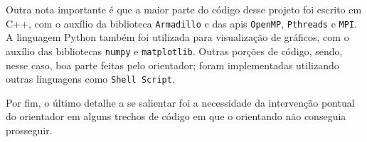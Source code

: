 Outra nota importante é que a maior parte do código desse projeto foi escrito em C++, com o auxílio da biblioteca \texttt{Armadillo} e das \gls{api}s \texttt{OpenMP}, \texttt{Pthreads} e \texttt{MPI}. A linguagem Python também foi utilizada para visualização de gráficos, com o auxílio das bibliotecas \texttt{numpy} e \texttt{matplotlib}. Outras porções de código, sendo, nesse caso, boa parte feitas pelo orientador; foram implementadas utilizando outras linguagens como \texttt{Shell Script}.

Por fim, o último detalhe a se salientar foi a necessidade da intervenção pontual do orientador em alguns trechos de código em que o orientando não conseguia prosseguir. 